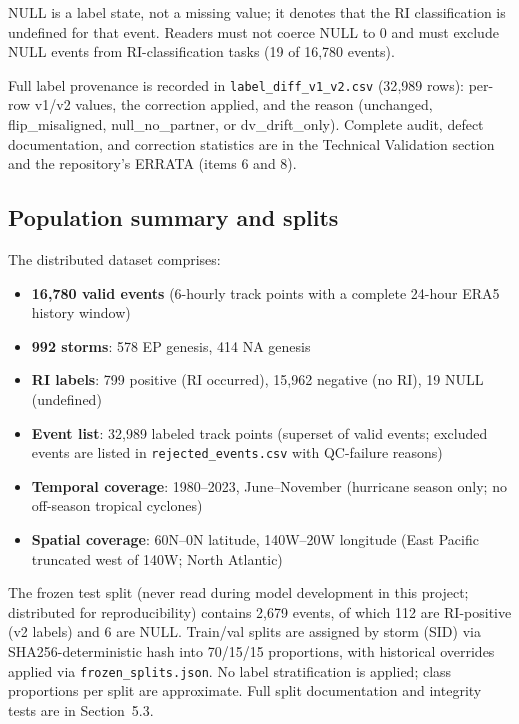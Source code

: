 \documentclass[11pt]{article}
\begin{document}
NULL is a label state, not a missing value; it denotes that the RI
classification is undefined for that event. Readers must not coerce NULL to 0
and must exclude NULL events from RI-classification tasks (19 of 16{,}780
events).

Full label provenance is recorded in \texttt{label\_diff\_v1\_v2.csv}
(32{,}989 rows): per-row v1/v2 values, the correction applied, and the reason
(unchanged, flip\_misaligned, null\_no\_partner, or dv\_drift\_only).
Complete audit, defect documentation, and correction statistics are in the
Technical Validation section and the repository's ERRATA (items 6 and 8).

\subsection{Population summary and splits}

The distributed dataset comprises:
\begin{itemize}
  \item \textbf{16{,}780 valid events} (6-hourly track points with a complete
  24-hour ERA5 history window)
  \item \textbf{992 storms}: 578 EP genesis, 414 NA genesis
  \item \textbf{RI labels}: 799 positive (RI occurred), 15{,}962 negative (no
  RI), 19 NULL (undefined)
  \item \textbf{Event list}: 32{,}989 labeled track points (superset of valid
  events; excluded events are listed in \texttt{rejected\_events.csv} with
  QC-failure reasons)
  \item \textbf{Temporal coverage}: 1980--2023, June--November (hurricane
  season only; no off-season tropical cyclones)
  \item \textbf{Spatial coverage}: 60\textdegree N--0\textdegree N latitude,
  140\textdegree W--20\textdegree W longitude (East Pacific truncated west of
  140\textdegree W; North Atlantic)
\end{itemize}

The frozen test split (never read during model development in this project;
distributed for reproducibility) contains 2{,}679 events, of which 112 are
RI-positive (v2 labels) and 6 are NULL. Train/val splits are assigned by storm
(SID) via SHA256-deterministic hash into 70/15/15 proportions, with historical
overrides applied via \texttt{frozen\_splits.json}. No label stratification is
applied; class proportions per split are approximate. Full split documentation
and integrity tests are in Section~5.3.
\end{document}
